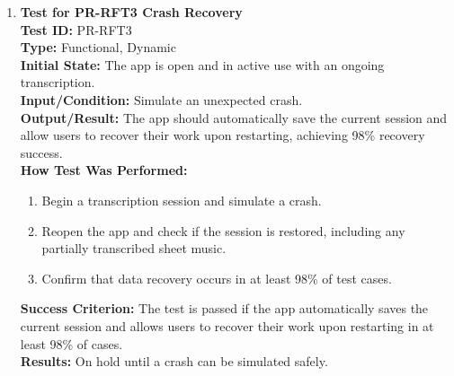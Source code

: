 \documentclass[12pt, titlepage]{article}
\begin{document}
\begin{enumerate}
    \item \textbf{Test for PR-RFT3 Crash Recovery} \\
      \newline
      \textbf{Test ID:} PR-RFT3 \\
      \textbf{Type:} Functional, Dynamic \\
      \textbf{Initial State:} The app is open and in active use with an ongoing transcription. \\
      \textbf{Input/Condition:} Simulate an unexpected crash. \\
      \textbf{Output/Result:} The app should automatically save the current session and allow users to recover their work 
      upon restarting, achieving 98\% recovery success. \\
      \textbf{How Test Was Performed:}
      \begin{enumerate}
          \item Begin a transcription session and simulate a crash.
          \item Reopen the app and check if the session is restored, including any partially transcribed sheet music.
          \item Confirm that data recovery occurs in at least 98\% of test cases.
      \end{enumerate}
      \textbf{Success Criterion:} The test is passed if the app automatically saves the current session and allows users to recover
      their work upon restarting in at least 98\% of cases.\\
      \textbf{Results:} On hold until a crash can be simulated safely.\\


\end{enumerate}
\end{document}
